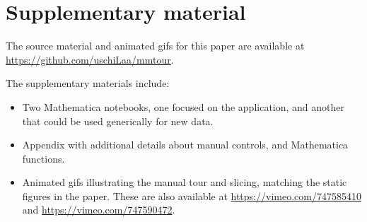 \documentclass[]{interact}
\theoremstyle{plain}%
\theoremstyle{definition}
\theoremstyle{remark}
\providecommand{\tightlist}{%
  \setlength{\itemsep}{0pt}\setlength{\parskip}{0pt}}
\def\tightlist{}
\begin{document}
\hypertarget{supplementary-material}{%
\section*{Supplementary material}\label{supplementary-material}}

The source material and animated gifs for this paper are available at
\url{https://github.com/uschiLaa/mmtour}.

The supplementary materials include:

\begin{itemize}
\tightlist
\item
  Two Mathematica notebooks, one focused on the application, and another
  that could be used generically for new data.
\item
  Appendix with additional details about manual controls, and
  Mathematica functions.
\item
  Animated gifs illustrating the manual tour and slicing, matching the
  static figures in the paper. These are also available at
  \url{https://vimeo.com/747585410} and
  \url{https://vimeo.com/747590472}.
\end{itemize}



\end{document}
